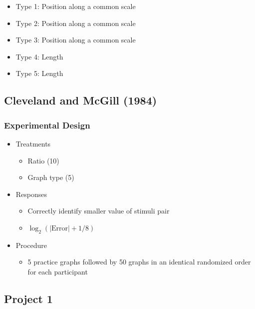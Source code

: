 \documentclass[phd]{nuthesis}
\begin{document}
\begin{itemize}
\tightlist
\item
  Type 1: Position along a common scale
\item
  Type 2: Position along a common scale
\item
  Type 3: Position along a common scale
\item
  Type 4: Length
\item
  Type 5: Length
\end{itemize}

\subsection{Cleveland and McGill (1984)}\label{cleveland1984-2}

\subsubsection{Experimental Design}\label{experimental-design}

\begin{itemize}
\tightlist
\item
  Treatments

  \begin{itemize}
  \tightlist
  \item
    Ratio (10)
  \item
    Graph type (5)
  \end{itemize}
\item
  Responses

  \begin{itemize}
  \tightlist
  \item
    Correctly identify smaller value of stimuli pair
  \item
    \(\log_2(|\text{Error}|+1/8)\)
  \end{itemize}
\item
  Procedure

  \begin{itemize}
  \tightlist
  \item
    5 practice graphs followed by 50 graphs in an identical randomized
    order for each participant
  \end{itemize}
\end{itemize}

\subsection{Project 1}\label{project-1}
\end{document}
